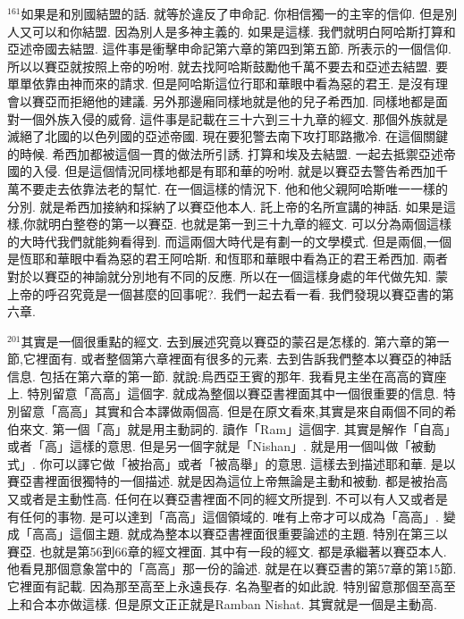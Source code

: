 \documentclass{book}
\begin{document}
$^{161}$如果是和別國結盟的話.
就等於違反了申命記.
你相信獨一的主宰的信仰.
但是別人又可以和你結盟.
因為別人是多神主義的.
如果是這樣.
我們就明白阿哈斯打算和亞述帝國去結盟.
這件事是衝擊申命記第六章的第四到第五節.
所表示的一個信仰.
所以以賽亞就按照上帝的吩咐.
就去找阿哈斯鼓勵他千萬不要去和亞述去結盟.
要單單依靠由神而來的請求.
但是阿哈斯這位行耶和華眼中看為惡的君王.
是沒有理會以賽亞而拒絕他的建議.
另外那邊廂同樣地就是他的兒子希西加.
同樣地都是面對一個外族入侵的威脅.
這件事是記載在三十六到三十九章的經文.
那個外族就是滅絕了北國的以色列國的亞述帝國.
現在要犯警去南下攻打耶路撒冷.
在這個關鍵的時候.
希西加都被這個一貫的做法所引誘.
打算和埃及去結盟.
一起去抵禦亞述帝國的入侵.
但是這個情況同樣地都是有耶和華的吩咐.
就是以賽亞去警告希西加千萬不要走去依靠法老的幫忙.
在一個這樣的情況下.
他和他父親阿哈斯唯一一樣的分別.
就是希西加接納和採納了以賽亞他本人.
託上帝的名所宣講的神話.
如果是這樣,你就明白整卷的第一以賽亞.
也就是第一到三十九章的經文.
可以分為兩個這樣的大時代我們就能夠看得到.
而這兩個大時代是有劃一的文學模式.
但是兩個,一個是恆耶和華眼中看為惡的君王阿哈斯.
和恆耶和華眼中看為正的君王希西加.
兩者對於以賽亞的神諭就分別地有不同的反應.
所以在一個這樣身處的年代做先知.
蒙上帝的呼召究竟是一個甚麼的回事呢?.
我們一起去看一看.
我們發現以賽亞書的第六章.

$^{201}$其實是一個很重點的經文.
去到展述究竟以賽亞的蒙召是怎樣的.
第六章的第一節,它裡面有.
或者整個第六章裡面有很多的元素.
去到告訴我們整本以賽亞的神話信息.
包括在第六章的第一節.
就說:烏西亞王賓的那年.
我看見主坐在高高的寶座上.
特別留意「高高」這個字.
就成為整個以賽亞書裡面其中一個很重要的信息.
特別留意「高高」其實和合本譯做兩個高.
但是在原文看來,其實是來自兩個不同的希伯來文.
第一個「高」就是用主動詞的.
讀作「Ram」這個字.
其實是解作「自高」或者「高」這樣的意思.
但是另一個字就是「Nishan」.
就是用一個叫做「被動式」.
你可以譯它做「被抬高」或者「被高舉」的意思.
這樣去到描述耶和華.
是以賽亞書裡面很獨特的一個描述.
就是因為這位上帝無論是主動和被動.
都是被抬高又或者是主動性高.
任何在以賽亞書裡面不同的經文所提到.
不可以有人又或者是有任何的事物.
是可以達到「高高」這個領域的.
唯有上帝才可以成為「高高」.
變成「高高」這個主題.
就成為整本以賽亞書裡面很重要論述的主題.
特別在第三以賽亞.
也就是第56到66章的經文裡面.
其中有一段的經文.
都是承繼著以賽亞本人.
他看見那個意象當中的「高高」那一份的論述.
就是在以賽亞書的第57章的第15節.
它裡面有記載.
因為那至高至上永遠長存.
名為聖者的如此說.
特別留意那個至高至上和合本亦做這樣.
但是原文正正就是Ramban Nishat.
其實就是一個是主動高.
\end{document}
